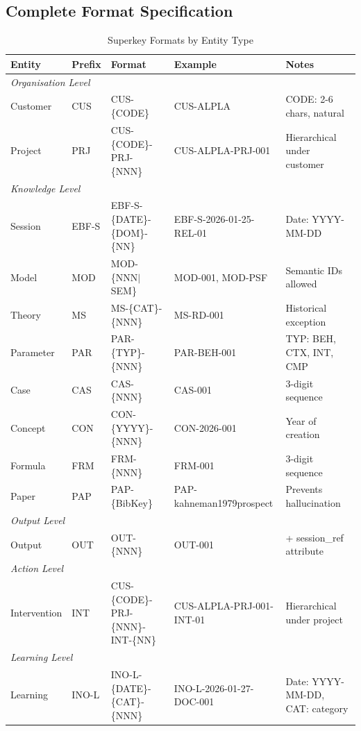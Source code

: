 \subsection{Complete Format Specification}

\begin{table}[htbp]
\centering
\caption{Superkey Formats by Entity Type}
\label{tab:superkey-formats}
\renewcommand{\arraystretch}{1.4}
\begin{tabular}{@{}llllp{3.5cm}@{}}
\toprule
\textbf{Entity} & \textbf{Prefix} & \textbf{Format} & \textbf{Example} & \textbf{Notes} \\
\midrule
\multicolumn{5}{l}{\textit{Organisation Level}} \\
Customer & CUS & CUS-\{CODE\} & CUS-ALPLA & CODE: 2-6 chars, natural \\
Project & PRJ & CUS-\{CODE\}-PRJ-\{NNN\} & CUS-ALPLA-PRJ-001 & Hierarchical under customer \\
\midrule
\multicolumn{5}{l}{\textit{Knowledge Level}} \\
Session & EBF-S & EBF-S-\{DATE\}-\{DOM\}-\{NN\} & EBF-S-2026-01-25-REL-01 & Date: YYYY-MM-DD \\
Model & MOD & MOD-\{NNN$|$SEM\} & MOD-001, MOD-PSF & Semantic IDs allowed \\
Theory & MS & MS-\{CAT\}-\{NNN\} & MS-RD-001 & Historical exception \\
Parameter & PAR & PAR-\{TYP\}-\{NNN\} & PAR-BEH-001 & TYP: BEH, CTX, INT, CMP \\
Case & CAS & CAS-\{NNN\} & CAS-001 & 3-digit sequence \\
Concept & CON & CON-\{YYYY\}-\{NNN\} & CON-2026-001 & Year of creation \\
Formula & FRM & FRM-\{NNN\} & FRM-001 & 3-digit sequence \\
Paper & PAP & PAP-\{BibKey\} & PAP-kahneman1979prospect & Prevents hallucination \\
\midrule
\multicolumn{5}{l}{\textit{Output Level}} \\
Output & OUT & OUT-\{NNN\} & OUT-001 & + session\_ref attribute \\
\midrule
\multicolumn{5}{l}{\textit{Action Level}} \\
Intervention & INT & CUS-\{CODE\}-PRJ-\{NNN\}-INT-\{NN\} & CUS-ALPLA-PRJ-001-INT-01 & Hierarchical under project \\
\midrule
\multicolumn{5}{l}{\textit{Learning Level}} \\
Learning & INO-L & INO-L-\{DATE\}-\{CAT\}-\{NNN\} & INO-L-2026-01-27-DOC-001 & Date: YYYY-MM-DD, CAT: category \\
\bottomrule
\end{tabular}
\end{table}

